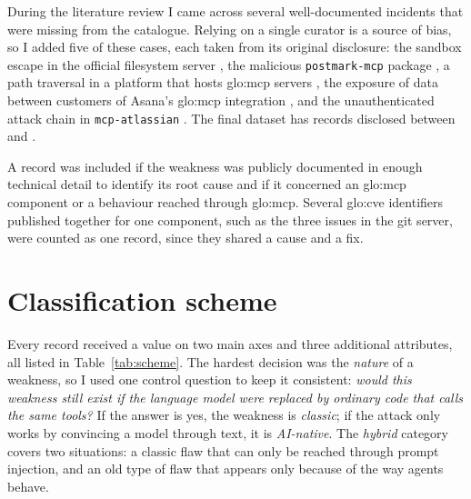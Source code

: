 \par During the literature review I came across several well-documented incidents that were missing from the catalogue. Relying on a single curator is a source of bias, so I added five of these cases, each taken from its original disclosure: the sandbox escape in the official filesystem server \cite{cymulate2025}, the malicious \texttt{postmark-mcp} package \cite{thn2025postmark}, a path traversal in a platform that hosts \acrshort{glo:mcp} servers \cite{gitguardian2025}, the exposure of data between customers of Asana's \acrshort{glo:mcp} integration \cite{pomerium2025asana}, and the unauthenticated attack chain in \texttt{mcp-atlassian} \cite{pluto2026}. The final dataset has \nRecords{} records disclosed between \firstDisclosure{} and \lastDisclosure{}.

\par A record was included if the weakness was publicly documented in enough technical detail to identify its root cause and if it concerned an \acrshort{glo:mcp} component or a behaviour reached through \acrshort{glo:mcp}. Several \acrshort{glo:cve} identifiers published together for one component, such as the three issues in the git server, were counted as one record, since they shared a cause and a fix.

\section{Classification scheme}

\par Every record received a value on two main axes and three additional attributes, all listed in Table~\ref{tab:scheme}. The hardest decision was the \textit{nature} of a weakness, so I used one control question to keep it consistent: \textit{would this weakness still exist if the language model were replaced by ordinary code that calls the same tools?} If the answer is yes, the weakness is \textit{classic}; if the attack only works by convincing a model through text, it is \textit{AI-native}. The \textit{hybrid} category covers two situations: a classic flaw that can only be reached through prompt injection, and an old type of flaw that appears only because of the way agents behave.

